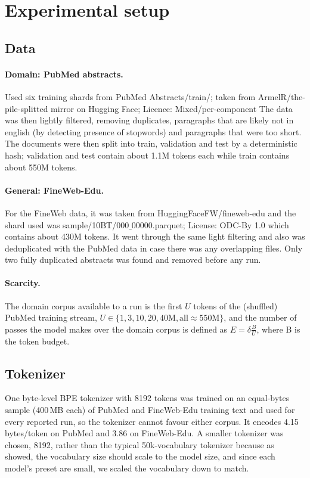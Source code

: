 \documentclass[10pt,a4paper]{article}
\begin{document}
\section{Experimental setup}
\subsection{Data}
\paragraph{Domain: PubMed abstracts.} Used six training shards from PubMed Abstracts/train/; taken from ArmelR/the-pile-splitted mirror on Hugging Face; Licence: Mixed/per-component \citep{gao2020pile}
The data was then lightly filtered, removing duplicates, paragraphs that are likely not in english (by detecting presence of stopwords) and paragraphs that were too short. The documents were then split into train, validation and test by a
deterministic hash; validation and test contain about 1.1M tokens each while train contains about 550M tokens.

\paragraph{General: FineWeb-Edu.} For the FineWeb data, it was taken from HuggingFaceFW/fineweb-edu and the shard used was sample/10BT/000$\_$00000.parquet; License: ODC-By 1.0 \citep{penedo2024fineweb} which contains about 430M tokens. It went through the same light filtering and also was deduplicated with the PubMed data in case there was any overlapping files. Only two fully duplicated abstracts was found and removed before any run.

\paragraph{Scarcity.} The domain corpus available to a run is the first $U$ tokens of the (shuffled) PubMed training
stream, $U\in\{1,3,10,20,40\text{M}, \text{all}\approx 550\text{M}\}$, and the number of passes the model makes over the domain corpus is defined as $E=\delta \frac{B}{U}$, where B is the token budget.

\subsection{Tokenizer}
One byte-level BPE tokenizer \citep{sennrich2016bpe,radford2019gpt2} with 8192 tokens was trained on an equal-bytes sample
(400\,MB each) of PubMed and FineWeb-Edu training text and used for every reported run, so the tokenizer cannot favour
either corpus. It encodes 4.15 bytes/token on PubMed and 3.86 on FineWeb-Edu. A smaller tokenizer was chosen, 8192, rather than the typical 50k-vocabulary tokenizer because as \citep{tao2024scaling} showed, the vocabulary size should scale to the model size, and since each model's preset are small, we scaled the vocabulary down to match.
\end{document}
